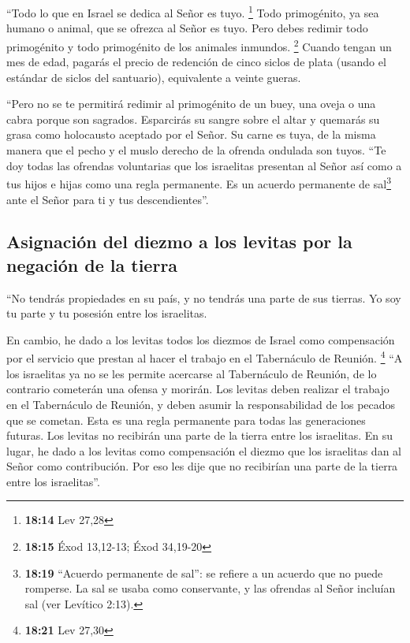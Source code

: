  ``Todo lo que en Israel se dedica al Señor es tuyo.
\footnote{\textbf{18:14} Lev 27,28}  Todo primogénito, ya
sea humano o animal, que se ofrezca al Señor es tuyo. Pero debes redimir
todo primogénito y todo primogénito de los animales inmundos.
\footnote{\textbf{18:15} Éxod 13,12-13; Éxod 34,19-20} 
Cuando tengan un mes de edad, pagarás el precio de redención de cinco
siclos de plata (usando el estándar de siclos del santuario),
equivalente a veinte gueras.

 ``Pero no se te permitirá redimir al primogénito de un
buey, una oveja o una cabra porque son sagrados. Esparcirás su sangre
sobre el altar y quemarás su grasa como holocausto aceptado por el
Señor.  Su carne es tuya, de la misma manera que el pecho
y el muslo derecho de la ofrenda ondulada son tuyos. 
``Te doy todas las ofrendas voluntarias que los israelitas presentan al
Señor así como a tus hijos e hijas como una regla permanente. Es un
acuerdo permanente de sal\footnote{\textbf{18:19} ``Acuerdo permanente
  de sal'': se refiere a un acuerdo que no puede romperse. La sal se
  usaba como conservante, y las ofrendas al Señor incluían sal (ver
  Levítico 2:13).} ante el Señor para ti y tus descendientes''.

\hypertarget{asignaciuxf3n-del-diezmo-a-los-levitas-por-la-negaciuxf3n-de-la-tierra}{%
\subsection{Asignación del diezmo a los levitas por la negación de la
tierra}\label{asignaciuxf3n-del-diezmo-a-los-levitas-por-la-negaciuxf3n-de-la-tierra}}

 ``No tendrás propiedades en su país, y no tendrás una
parte de sus tierras. Yo soy tu parte y tu posesión entre los
israelitas.

 En cambio, he dado a los levitas todos los diezmos de
Israel como compensación por el servicio que prestan al hacer el trabajo
en el Tabernáculo de Reunión. \footnote{\textbf{18:21} Lev 27,30}
 ``A los israelitas ya no se les permite acercarse al
Tabernáculo de Reunión, de lo contrario cometerán una ofensa y morirán.
 Los levitas deben realizar el trabajo en el Tabernáculo
de Reunión, y deben asumir la responsabilidad de los pecados que se
cometan. Esta es una regla permanente para todas las generaciones
futuras. Los levitas no recibirán una parte de la tierra entre los
israelitas.  En su lugar, he dado a los levitas como
compensación el diezmo que los israelitas dan al Señor como
contribución. Por eso les dije que no recibirían una parte de la tierra
entre los israelitas''.

